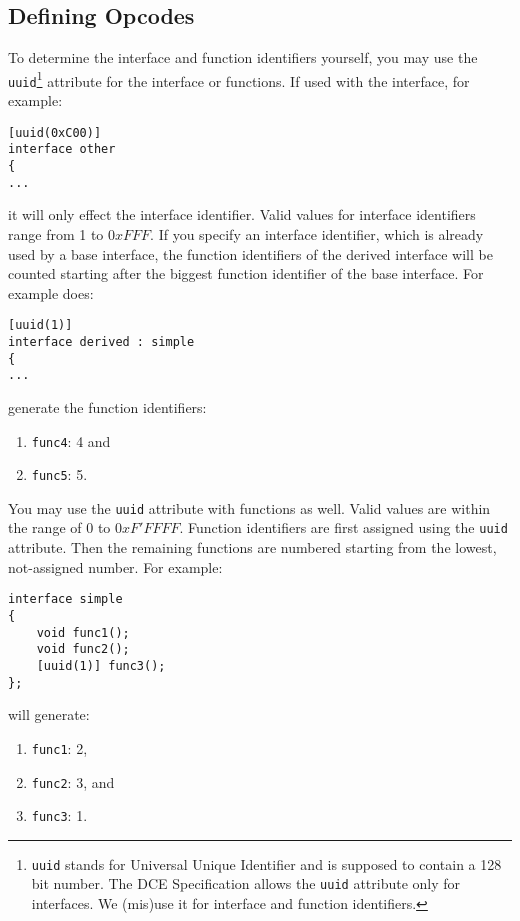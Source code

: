 \subsection{Defining Opcodes}
\label{sec:uuid}
To determine the interface and function identifiers yourself,
you may use the \verb|uuid|\footnote{{\tt uuid} stands for Universal
Unique Identifier and is supposed to contain a 128 bit number. The DCE
Specification allows the {\tt uuid} attribute only for interfaces. We
(mis)use it for interface and function identifiers.} attribute for the
interface or functions. If used with the interface, for example:

\begin{verbatim}
[uuid(0xC00)]
interface other
{
...
\end{verbatim}

it will only effect the interface identifier. Valid values for interface
identifiers range from 1 to $0xFFF$. If you specify an interface
identifier, which is already used by a base interface, the function
identifiers of the derived interface will be counted starting
after the biggest function identifier of the base interface. For example does:

\begin{verbatim}
[uuid(1)]
interface derived : simple
{
...
\end{verbatim}

generate the function identifiers:

\begin{enumerate}
\item \verb|func4|: 4 and
\item \verb|func5|: 5.
\end{enumerate}

You may use the \verb|uuid| attribute with functions as
well. Valid values are within the range of $0$ to $0xF'FFFF$.
Function identifiers are first assigned
using the \verb|uuid| attribute. Then the remaining functions are
numbered starting from the lowest, not-assigned number. For example:

\begin{verbatim}
interface simple
{
    void func1();
    void func2();
    [uuid(1)] func3();
};
\end{verbatim}

will generate:

\begin{enumerate}
\item \verb|func1|: 2,
\item \verb|func2|: 3, and
\item \verb|func3|: 1.
\end{enumerate}

